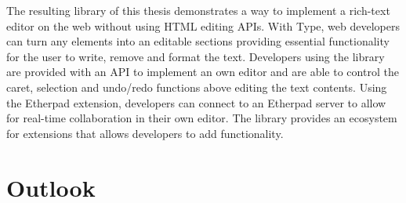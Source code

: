 
The resulting library of this thesis demonstrates a way to implement a rich-text editor on the web without using HTML editing APIs. With Type, web developers can turn any elements into an editable sections providing essential functionality for the user to write, remove and format the text. Developers using the library are provided with an API to implement an own editor and are able to control the caret, selection and undo/redo functions above editing the text contents. Using the Etherpad extension, developers can connect to an Etherpad server to allow for real-time collaboration in their own editor. The library provides an ecosystem for extensions that allows developers to add functionality.







 
 



\section{Outlook}

